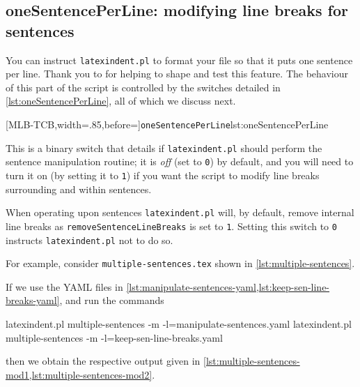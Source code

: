 \subsection{oneSentencePerLine: modifying line breaks for sentences}\label{sec:onesentenceperline}

	You can instruct \texttt{latexindent.pl} to format  your file so that it puts one sentence per line. Thank you to \cite{mlep} for
	helping to shape and test this feature. The behaviour of this part of the script is
	controlled by the switches detailed in \cref{lst:oneSentencePerLine}, all of which we
	discuss next. 
	 

	[MLB-TCB,width=.85\linewidth,before=\centering]{\texttt{oneSentencePerLine}}{lst:oneSentencePerLine}

	This is a binary switch that details if \texttt{latexindent.pl} should perform the
	sentence manipulation routine; it is \emph{off} (set to \texttt{0}) by default, and you
	will need to turn it on (by setting it to \texttt{1}) if you want the script to modify
	line breaks surrounding and within sentences.

	When operating upon sentences \texttt{latexindent.pl} will, by default, remove internal
	line breaks as \texttt{removeSentenceLineBreaks} is set to \texttt{1}. Setting this
	switch to \texttt{0} instructs \texttt{latexindent.pl} not to do so.

	For example, consider \texttt{multiple-sentences.tex} shown in
	\cref{lst:multiple-sentences}.


	If we use the YAML files in
	\cref{lst:manipulate-sentences-yaml,lst:keep-sen-line-breaks-yaml}, and run the commands
	 
	\begin{widepage}
		\begin{commandshell}
latexindent.pl multiple-sentences -m -l=manipulate-sentences.yaml
latexindent.pl multiple-sentences -m -l=keep-sen-line-breaks.yaml
\end{commandshell}
	\end{widepage}
	then we obtain the respective output given in
	\cref{lst:multiple-sentences-mod1,lst:multiple-sentences-mod2}.


